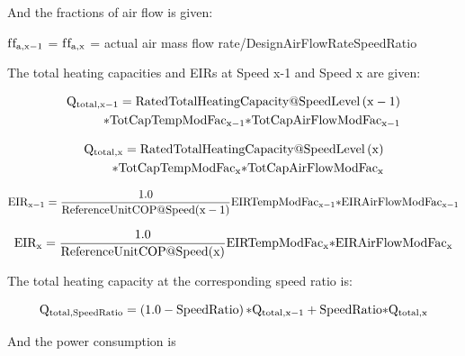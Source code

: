 And the fractions of air flow is given:

\({\rm{f}}{{\rm{f}}_{{\rm{a}},{\rm{x}} - 1}}\) = \({\rm{f}}{{\rm{f}}_{{\rm{a}},{\rm{x}}}}\) = actual air mass flow rate/DesignAirFlowRateSpeedRatio

The total heating capacities and EIRs at Speed x-1 and Speed x are given:

\begin{equation}
\begin{split}
{{\rm{Q}}_{{\rm{total}},{\rm{x}} - 1}} = {\rm{RatedTotalHeatingCapacity}}@{\rm{SpeedLevel}}\left( {{\rm{x}} - 1} \right) \\
{\rm{*TotCapTempModFa}}{{\rm{c}}_{{\rm{x}} - 1}} {\rm{*TotCapAirFlowModFa}}{{\rm{c}}_{{\rm{x}} - 1}}
\end{split}
\end{equation}

\begin{equation}
\begin{split}
{{\rm{Q}}_{{\rm{total}},{\rm{x}}}} = {\rm{RatedTotalHeatingCapacity}}@{\rm{SpeedLevel}}\left( {\rm{x}} \right) \\
{\rm{*TotCapTempModFa}}{{\rm{c}}_{\rm{x}}} {\rm{*TotCapAirFlowModFa}}{{\rm{c}}_{\rm{x}}}
\end{split}
\end{equation}

\begin{equation}
{\rm{EI}}{{\rm{R}}_{{\rm{x}} - 1}} = \frac{{1.0}}{{{\rm{ReferenceUnitCOP}}@{\rm{Speed}}({\rm{x}} - 1)}}{\rm{EIRTempModFa}}{{\rm{c}}_{{\rm{x}} - 1}}{\rm{*EIRAirFlowModFa}}{{\rm{c}}_{{\rm{x}} - 1}}
\end{equation}

\begin{equation}
{\rm{EI}}{{\rm{R}}_{\rm{x}}} = \frac{{1.0}}{{{\rm{ReferenceUnitCOP}}@{\rm{Speed}}({\rm{x}})}}{\rm{EIRTempModFa}}{{\rm{c}}_{\rm{x}}}{\rm{*EIRAirFlowModFa}}{{\rm{c}}_{\rm{x}}}
\end{equation}

The total heating capacity at the corresponding speed ratio is:

\begin{equation}
{{\rm{Q}}_{{\rm{total}},{\rm{SpeedRatio}}}} = \left( {1.0 - {\rm{SpeedRatio}}} \right){\rm{*}}{{\rm{Q}}_{{\rm{total}},{\rm{x}} - 1}} + {\rm{SpeedRatio*}}{{\rm{Q}}_{{\rm{total}},{\rm{x}}}}
\end{equation}

And the power consumption is

